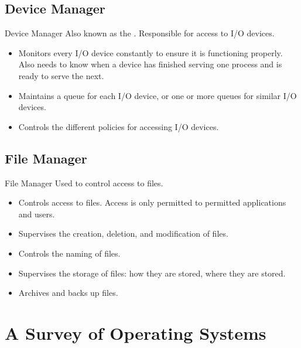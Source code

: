 \documentclass[\main/notes.tex]{subfiles}
\begin{document}
			\subsection{Device Manager}
				\begin{definition}{Device Manager}
					Also known as the . Responsible for access to I/O devices.

					\begin{itemize}[nosep]
						\item Monitors every I/O device constantly to ensure it is functioning properly. Also needs to know when a device has finished serving one process and is ready to serve the next.
						\item Maintains a queue for each I/O device, or one or more queues for similar I/O devices.
						\item Controls the different policies for accessing I/O devices.
					\end{itemize}
				\end{definition}

			\subsection{File Manager}
				\begin{definition}{File Manager}
					Used to control access to files.

					\begin{itemize}[nosep]
						\item Controls access to files. Access is only permitted to permitted applications and users.
						\item Supervises the creation, deletion, and modification of files.
						\item Controls the naming of files.
						\item Supervises the storage of files: how they are stored, where they are stored.
						\item Archives and backs up files.
					\end{itemize}
				\end{definition}

		\section{A Survey of Operating Systems}
\end{document}
